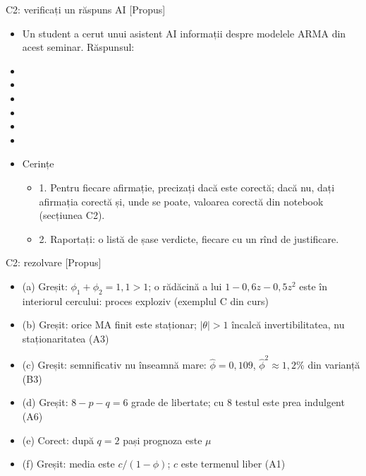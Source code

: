 \begin{frame}{C2: verificați un răspuns AI [Propus]}
\itemsize{\scriptsize}
\begin{itemize}
    \item Un student a cerut unui asistent AI informații despre modelele ARMA din acest seminar. Răspunsul:
    \item {}
    \item {}
    \item {}
    \item {}
    \item {}
    \item {}
    \item Cerințe
    \begin{itemize}
        \item 1. Pentru fiecare afirmație, precizați dacă este corectă; dacă nu, dați afirmația corectă și, unde se poate, valoarea corectă din notebook (secțiunea C2).
        \item 2. Raportați: o listă de șase verdicte, fiecare cu un rînd de justificare.
    \end{itemize}
\end{itemize}
\end{frame}

\ifsolutions
\begin{frame}{C2: rezolvare [Propus]}
\itemsize{\scriptsize}
\begin{itemize}
    \item (a) Greșit: $\phi_1 + \phi_2 = 1{,}1 > 1$; o rădăcină a lui $1 - 0{,}6z - 0{,}5z^2$ este în interiorul cercului: proces exploziv (exemplul C din curs)
    \item (b) Greșit: orice MA finit este staționar; $|\theta| > 1$ încalcă invertibilitatea, nu staționaritatea (A3)
    \item (c) Greșit: semnificativ nu înseamnă mare: $\hat\phi = 0{,}109$, $\hat\phi^2 \approx 1{,}2\%$ din varianță (B3)
    \item (d) Greșit: $8 - p - q = 6$ grade de libertate; cu 8 testul este prea indulgent (A6)
    \item (e) Corect: după $q = 2$ pași prognoza este $\mu$
    \item (f) Greșit: media este $c/(1 - \phi)$; $c$ este termenul liber (A1)
\end{itemize}
\end{frame}
\fi


